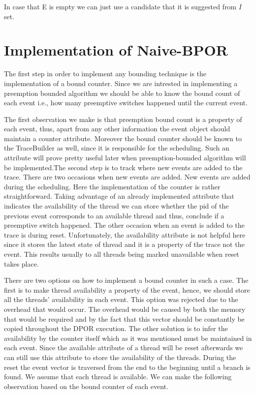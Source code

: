 In case that E is empty we can just use a candidate that it is suggested from $I$ set.

\section{Implementation of Naive-BPOR}

The first step in order to implement any bounding technique is the implementation of a bound counter. Since we are
intrested in implementing a preemption bounded algorithm we should be able to know the bound count of each event i.e.,
how many preemptive switches happened until the current event. 

The first observation we make is that preemption bound count is a property of each event, thus, apart from any other
information the event object should maintain a counter attribute. Moreover the bound counter should be known to the
TraceBuilder as well, since it is responsible for the scheduling. Such an attribute will prove pretty useful later when
preemption-bounded algorithm will be implemented.The second step is to track where new events are added to the trace.
There are two occasions when new events are added. New events are added during the scheduling. Here the implementation
of the counter is rather straightforward. Taking advantage of an already implemented attribute that indicates the
availability of the thread we can store whether the pid of the previous event corresponds to an available thread and
thus, conclude if a preemptive switch happened. The other occasion when an event is added to the trace is during reset.
Unfortunately, the availability attribute is not helpful here since it stores the latest state of thread and it is a
property of the trace not the event. This results usually to all threads being marked unavailable when reset takes
place.

There are two options on how to implement a bound counter in such a case. The first is to make thread availability a
property of the event, hence, we should store all the threads' availability in each event. This option was rejected due
to the overhead that would occur. The overhead would be caused by both the memory that would be required and by the fact
that this vector should be constantly be copied throughout the DPOR execution. The other solution is to infer the
availability by the counter itself which as it was mentioned must be maintained in each event. Since the available
attribute of a thread will be reset afterwards we can still use this attribute to store the availability of the threads.
During the reset the event vector is traversed from the end to the beginning until a branch is found. We assume that
each thread is available. We can make the following observation based on the bound counter of each event.

